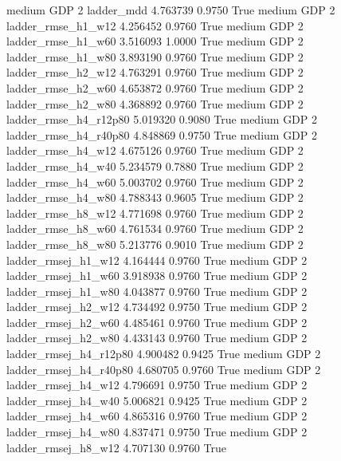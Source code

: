     medium      GDP                 2             ladder_mdd   4.763739      0.9750    True
    medium      GDP                 2     ladder_rmse_h1_w12   4.256452      0.9760    True
    medium      GDP                 2     ladder_rmse_h1_w60   3.516093      1.0000    True
    medium      GDP                 2     ladder_rmse_h1_w80   3.893190      0.9760    True
    medium      GDP                 2     ladder_rmse_h2_w12   4.763291      0.9760    True
    medium      GDP                 2     ladder_rmse_h2_w60   4.653872      0.9760    True
    medium      GDP                 2     ladder_rmse_h2_w80   4.368892      0.9760    True
    medium      GDP                 2  ladder_rmse_h4_r12p80   5.019320      0.9080    True
    medium      GDP                 2  ladder_rmse_h4_r40p80   4.848869      0.9750    True
    medium      GDP                 2     ladder_rmse_h4_w12   4.675126      0.9760    True
    medium      GDP                 2     ladder_rmse_h4_w40   5.234579      0.7880    True
    medium      GDP                 2     ladder_rmse_h4_w60   5.003702      0.9760    True
    medium      GDP                 2     ladder_rmse_h4_w80   4.788343      0.9605    True
    medium      GDP                 2     ladder_rmse_h8_w12   4.771698      0.9760    True
    medium      GDP                 2     ladder_rmse_h8_w60   4.761534      0.9760    True
    medium      GDP                 2     ladder_rmse_h8_w80   5.213776      0.9010    True
    medium      GDP                 2    ladder_rmsej_h1_w12   4.164444      0.9760    True
    medium      GDP                 2    ladder_rmsej_h1_w60   3.918938      0.9760    True
    medium      GDP                 2    ladder_rmsej_h1_w80   4.043877      0.9760    True
    medium      GDP                 2    ladder_rmsej_h2_w12   4.734492      0.9750    True
    medium      GDP                 2    ladder_rmsej_h2_w60   4.485461      0.9760    True
    medium      GDP                 2    ladder_rmsej_h2_w80   4.433143      0.9760    True
    medium      GDP                 2 ladder_rmsej_h4_r12p80   4.900482      0.9425    True
    medium      GDP                 2 ladder_rmsej_h4_r40p80   4.680705      0.9760    True
    medium      GDP                 2    ladder_rmsej_h4_w12   4.796691      0.9750    True
    medium      GDP                 2    ladder_rmsej_h4_w40   5.006821      0.9425    True
    medium      GDP                 2    ladder_rmsej_h4_w60   4.865316      0.9760    True
    medium      GDP                 2    ladder_rmsej_h4_w80   4.837471      0.9750    True
    medium      GDP                 2    ladder_rmsej_h8_w12   4.707130      0.9760    True
